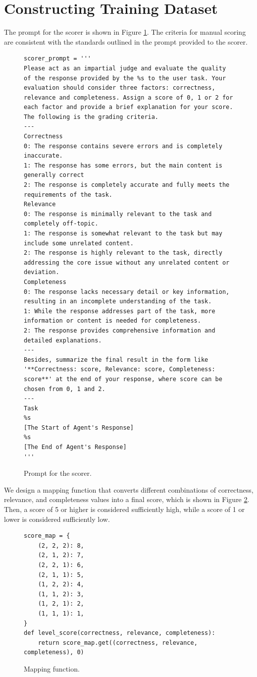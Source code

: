 \section{Constructing Training Dataset}
The prompt for the scorer is shown in Figure \ref{scorer_prompt}. The criteria for manual scoring are consistent with the standards outlined in the prompt provided to the scorer.
\label{training}
\begin{figure}[H]
\centering
\begin{lstlisting}[frame=single, basicstyle=\scriptsize\ttfamily, breaklines=true]
scorer_prompt = '''
Please act as an impartial judge and evaluate the quality of the response provided by the %s to the user task. Your evaluation should consider three factors: correctness, relevance and completeness. Assign a score of 0, 1 or 2 for each factor and provide a brief explanation for your score. The following is the grading criteria.
---
Correctness
0: The response contains severe errors and is completely inaccurate.
1: The response has some errors, but the main content is generally correct
2: The response is completely accurate and fully meets the requirements of the task.
Relevance
0: The response is minimally relevant to the task and completely off-topic.
1: The response is somewhat relevant to the task but may include some unrelated content.
2: The response is highly relevant to the task, directly addressing the core issue without any unrelated content or deviation.
Completeness
0: The response lacks necessary detail or key information, resulting in an incomplete understanding of the task.
1: While the response addresses part of the task, more information or content is needed for completeness.
2: The response provides comprehensive information and detailed explanations.
---
Besides, summarize the final result in the form like '**Correctness: score, Relevance: score, Completeness: score**' at the end of your response, where score can be chosen from 0, 1 and 2.
---
Task
%s
[The Start of Agent's Response]
%s
[The End of Agent's Response]
'''
\end{lstlisting}
\caption{Prompt for the scorer.}
\label{scorer_prompt}
\end{figure}



We design a mapping function that converts different combinations of correctness, relevance, and completeness values into a final score, which is shown in Figure \ref{mapping}. Then, a score of 5 or higher is considered sufficiently high, while a score of 1 or lower is considered sufficiently low.
\begin{figure}[H]
\centering
\begin{lstlisting}[frame=single, basicstyle=\scriptsize\ttfamily, breaklines=true]
score_map = {
    (2, 2, 2): 8,
    (2, 1, 2): 7,
    (2, 2, 1): 6,
    (2, 1, 1): 5,
    (1, 2, 2): 4,
    (1, 1, 2): 3,
    (1, 2, 1): 2,
    (1, 1, 1): 1,
}
def level_score(correctness, relevance, completeness):
    return score_map.get((correctness, relevance, completeness), 0)
\end{lstlisting}
\caption{Mapping function.}
\label{mapping}
\end{figure}

